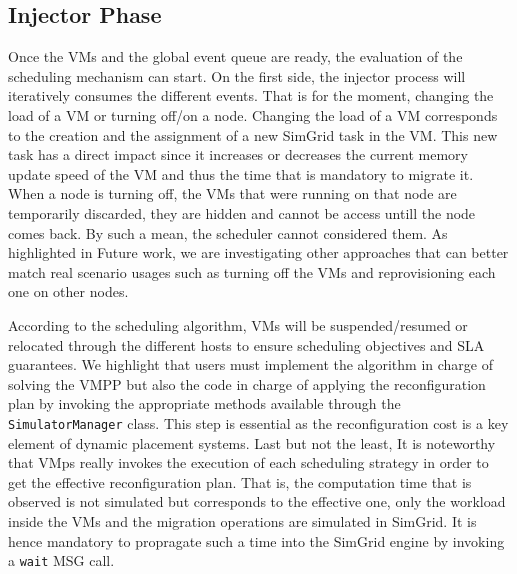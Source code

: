 \documentclass[conference]{IEEEtran}
\newcommand{\sg}{SimGrid\xspace}
\newcommand{\vmps}{VMps\xspace}
\begin{document}
\subsection{Injector Phase}
Once the VMs and the global event queue are ready, the evaluation of the
scheduling mechanism can start. On the first side, the injector
process will iteratively
consumes the different events. That is for the moment, changing the load of a VM or
turning off/on a node.
Changing the load of a VM corresponds to the
creation and the assignment of a new \sg task in the VM. This new task has
a direct impact since it increases or decreases the current memory
update speed of the VM and thus the time that is mandatory to migrate
it. 
When a node is turning off, the VMs that were running on that node are
temporarily discarded, \ie they are hidden and cannot be access untill
the node comes back. By such a mean, the scheduler cannot considered
them.
As highlighted in Future work, we are investigating other
approaches that can better match real scenario usages such as turning
off the VMs and reprovisioning each one  on other nodes.
%

According to the scheduling algorithm, VMs will be suspended/resumed or
relocated through the
different hosts to ensure scheduling objectives and SLA guarantees.
We highlight that users must implement the algorithm in charge of
solving the VMPP but also the code in charge of
applying the reconfiguration plan by invoking the appropriate methods
available through the \texttt{SimulatorManager} class. This step is
essential as the reconfiguration cost is a key element of dynamic
placement systems.
Last but not the least, It is noteworthy that \vmps really invokes the execution of
each scheduling strategy in order to get the effective reconfiguration
plan.  That is, the computation time that is observed
is not simulated but corresponds to the effective one, only the
workload inside the VMs and the migration operations are simulated in
\sg. It is hence mandatory to propragate such a time into the \sg
engine by invoking a \texttt{wait} MSG call.
\end{document}
